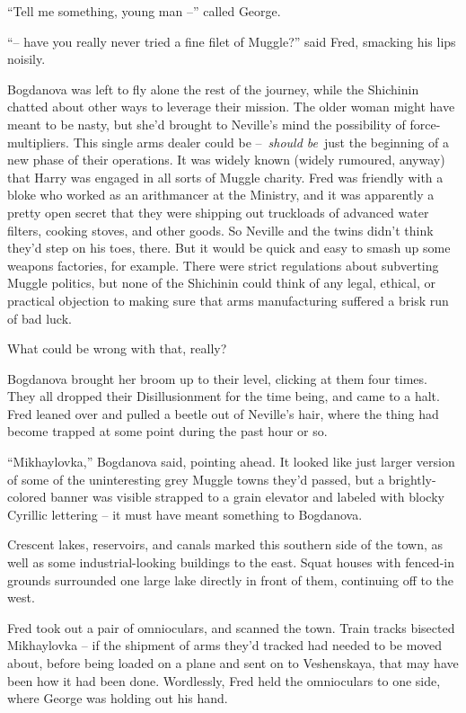 ``Tell me something, young man --'' called George.

``-- have you really never tried a fine filet of Muggle?'' said Fred,
smacking his lips noisily.

Bogdanova was left to fly alone the rest of the journey, while the
Shichinin chatted about other ways to leverage their mission. The older
woman might have meant to be nasty, but she'd brought to Neville's mind
the possibility of force-multipliers. This single arms dealer could be
--~\emph{should be}~just the beginning of a new phase of their
operations. It was widely known (widely rumoured, anyway) that Harry was
engaged in all sorts of Muggle charity. Fred was friendly with a bloke
who worked as an arithmancer at the Ministry, and it was apparently a
pretty open secret that they were shipping out truckloads of advanced
water filters, cooking stoves, and other goods. So Neville and the twins
didn't think they'd step on his toes, there. But it would be quick and
easy to smash up some weapons factories, for example. There were strict
regulations about subverting Muggle politics, but none of the Shichinin
could think of any legal, ethical, or practical objection to making sure
that arms manufacturing suffered a brisk run of bad luck.

What could be wrong with that, really?

\mybreak

Bogdanova brought her broom up to their level, clicking at them four
times. They all dropped their Disillusionment for the time being, and
came to a halt. Fred leaned over and pulled a beetle out of Neville's
hair, where the thing had become trapped at some point during the past
hour or so.

``Mikhaylovka,'' Bogdanova said, pointing ahead. It looked like just
larger version of some of the uninteresting grey Muggle towns they'd
passed, but a brightly-colored banner was visible strapped to a grain
elevator and labeled with blocky Cyrillic lettering -- it must have
meant something to Bogdanova.

Crescent lakes, reservoirs, and canals marked this southern side of the
town, as well as some industrial-looking buildings to the east. Squat
houses with fenced-in grounds surrounded one large lake directly in
front of them, continuing off to the west.

Fred took out a pair of omnioculars, and scanned the town. Train tracks
bisected Mikhaylovka -- if the shipment of arms they'd tracked had
needed to be moved about, before being loaded on a plane and sent on to
Veshenskaya, that may have been how it had been done. Wordlessly, Fred
held the omnioculars to one side, where George was holding out his hand.

